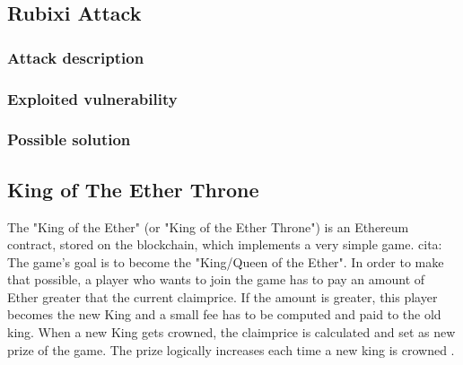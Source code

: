 \subsection{Rubixi Attack}
\subsubsection{Attack description}
\subsubsection{Exploited vulnerability}
\subsubsection{Possible solution}



\subsection{King of The Ether Throne}
The "King of the Ether" (or "King of the Ether Throne") is an Ethereum contract, stored on the blockchain, which implements a very simple game. cita: %
The game's goal is to become the "King/Queen of the Ether". In order to make that possible, a player who wants to join the game has to pay an amount of Ether greater that the current claimprice. If the amount is greater, this player becomes the new King and a small fee has to be computed and paid to the old king. 
When a new King gets crowned, the claimprice is calculated and set as new prize of the game. The prize logically increases each time a new king is crowned \cite{paper2}. \\

